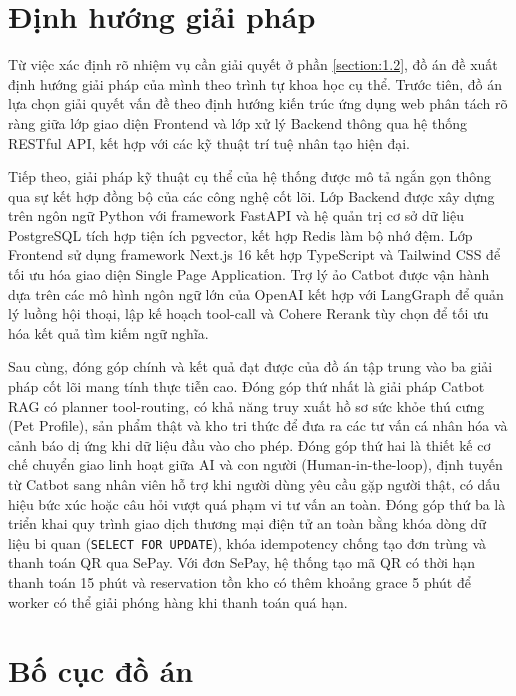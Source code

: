 \documentclass[../DoAn.tex]{subfiles}
\begin{document}
\section{Định hướng giải pháp}
\label{section:1.3}

Từ việc xác định rõ nhiệm vụ cần giải quyết ở phần \ref{section:1.2}, đồ án đề xuất định hướng giải pháp của mình theo trình tự khoa học cụ thể. Trước tiên, đồ án lựa chọn giải quyết vấn đề theo định hướng kiến trúc ứng dụng web phân tách rõ ràng giữa lớp giao diện Frontend và lớp xử lý Backend thông qua hệ thống RESTful API, kết hợp với các kỹ thuật trí tuệ nhân tạo hiện đại.

Tiếp theo, giải pháp kỹ thuật cụ thể của hệ thống được mô tả ngắn gọn thông qua sự kết hợp đồng bộ của các công nghệ cốt lõi. Lớp Backend được xây dựng trên ngôn ngữ Python với framework FastAPI và hệ quản trị cơ sở dữ liệu PostgreSQL tích hợp tiện ích pgvector, kết hợp Redis làm bộ nhớ đệm. Lớp Frontend sử dụng framework Next.js 16 kết hợp TypeScript và Tailwind CSS để tối ưu hóa giao diện Single Page Application. Trợ lý ảo Catbot được vận hành dựa trên các mô hình ngôn ngữ lớn của OpenAI kết hợp với LangGraph để quản lý luồng hội thoại, lập kế hoạch tool-call và Cohere Rerank tùy chọn để tối ưu hóa kết quả tìm kiếm ngữ nghĩa.

Sau cùng, đóng góp chính và kết quả đạt được của đồ án tập trung vào ba giải pháp cốt lõi mang tính thực tiễn cao. Đóng góp thứ nhất là giải pháp Catbot RAG có planner tool-routing, có khả năng truy xuất hồ sơ sức khỏe thú cưng (Pet Profile), sản phẩm thật và kho tri thức để đưa ra các tư vấn cá nhân hóa và cảnh báo dị ứng khi dữ liệu đầu vào cho phép. Đóng góp thứ hai là thiết kế cơ chế chuyển giao linh hoạt giữa AI và con người (Human-in-the-loop), định tuyến từ Catbot sang nhân viên hỗ trợ khi người dùng yêu cầu gặp người thật, có dấu hiệu bức xúc hoặc câu hỏi vượt quá phạm vi tư vấn an toàn. Đóng góp thứ ba là triển khai quy trình giao dịch thương mại điện tử an toàn bằng khóa dòng dữ liệu bi quan (\texttt{SELECT FOR UPDATE}), khóa idempotency chống tạo đơn trùng và thanh toán QR qua SePay. Với đơn SePay, hệ thống tạo mã QR có thời hạn thanh toán 15 phút và reservation tồn kho có thêm khoảng grace 5 phút để worker có thể giải phóng hàng khi thanh toán quá hạn.

\section{Bố cục đồ án}
\label{section:1.4}
\end{document}
